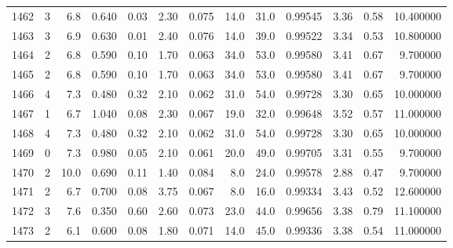\begin{tabular}{lrrrrrrrrrrrr}
1462 &        3 &            6.8 &             0.640 &         0.03 &            2.30 &      0.075 &                 14.0 &                  31.0 &  0.99545 &  3.36 &       0.58 &  10.400000 \\
1463 &        3 &            6.9 &             0.630 &         0.01 &            2.40 &      0.076 &                 14.0 &                  39.0 &  0.99522 &  3.34 &       0.53 &  10.800000 \\
1464 &        2 &            6.8 &             0.590 &         0.10 &            1.70 &      0.063 &                 34.0 &                  53.0 &  0.99580 &  3.41 &       0.67 &   9.700000 \\
1465 &        2 &            6.8 &             0.590 &         0.10 &            1.70 &      0.063 &                 34.0 &                  53.0 &  0.99580 &  3.41 &       0.67 &   9.700000 \\
1466 &        4 &            7.3 &             0.480 &         0.32 &            2.10 &      0.062 &                 31.0 &                  54.0 &  0.99728 &  3.30 &       0.65 &  10.000000 \\
1467 &        1 &            6.7 &             1.040 &         0.08 &            2.30 &      0.067 &                 19.0 &                  32.0 &  0.99648 &  3.52 &       0.57 &  11.000000 \\
1468 &        4 &            7.3 &             0.480 &         0.32 &            2.10 &      0.062 &                 31.0 &                  54.0 &  0.99728 &  3.30 &       0.65 &  10.000000 \\
1469 &        0 &            7.3 &             0.980 &         0.05 &            2.10 &      0.061 &                 20.0 &                  49.0 &  0.99705 &  3.31 &       0.55 &   9.700000 \\
1470 &        2 &           10.0 &             0.690 &         0.11 &            1.40 &      0.084 &                  8.0 &                  24.0 &  0.99578 &  2.88 &       0.47 &   9.700000 \\
1471 &        2 &            6.7 &             0.700 &         0.08 &            3.75 &      0.067 &                  8.0 &                  16.0 &  0.99334 &  3.43 &       0.52 &  12.600000 \\
1472 &        3 &            7.6 &             0.350 &         0.60 &            2.60 &      0.073 &                 23.0 &                  44.0 &  0.99656 &  3.38 &       0.79 &  11.100000 \\
1473 &        2 &            6.1 &             0.600 &         0.08 &            1.80 &      0.071 &                 14.0 &                  45.0 &  0.99336 &  3.38 &       0.54 &  11.000000 \\

\end{tabular}
